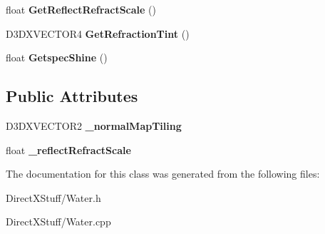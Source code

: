 \begin{DoxyCompactItemize}
\item 
\hypertarget{class_water_ab00aae3a0ebcf8fb74a8b3967925e080}{float {\bfseries Get\-Reflect\-Refract\-Scale} ()}\label{class_water_ab00aae3a0ebcf8fb74a8b3967925e080}

\item 
\hypertarget{class_water_a5e9336d6c57fa5eb6231d16423b94fcd}{D3\-D\-X\-V\-E\-C\-T\-O\-R4 {\bfseries Get\-Refraction\-Tint} ()}\label{class_water_a5e9336d6c57fa5eb6231d16423b94fcd}

\item 
\hypertarget{class_water_a9adf8c117e4326d98fcbd9d37cd10bec}{float {\bfseries Getspec\-Shine} ()}\label{class_water_a9adf8c117e4326d98fcbd9d37cd10bec}

\end{DoxyCompactItemize}
\subsection*{Public Attributes}
\begin{DoxyCompactItemize}
\item 
\hypertarget{class_water_a17752cc727c57bc9359d21854b86e953}{D3\-D\-X\-V\-E\-C\-T\-O\-R2 {\bfseries \-\_\-normal\-Map\-Tiling}}\label{class_water_a17752cc727c57bc9359d21854b86e953}

\item 
\hypertarget{class_water_a2cc27ca8f902215ff307b043dd9b2eba}{float {\bfseries \-\_\-reflect\-Refract\-Scale}}\label{class_water_a2cc27ca8f902215ff307b043dd9b2eba}

\end{DoxyCompactItemize}


The documentation for this class was generated from the following files\-:\begin{DoxyCompactItemize}
\item 
Direct\-X\-Stuff/Water.\-h\item 
Direct\-X\-Stuff/Water.\-cpp\end{DoxyCompactItemize}
